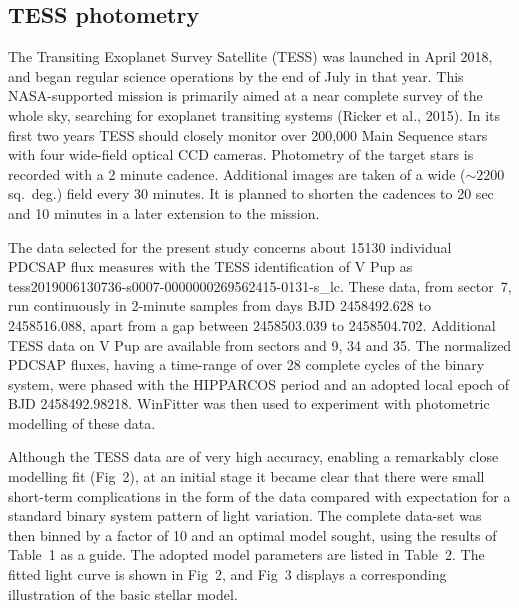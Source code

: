 \documentclass[useAMS,usenatbib]{mnras}                                                                           \usepackage[pdftex]{graphicx}
\begin{document}
 \subsection{TESS photometry}
The Transiting Exoplanet Survey Satellite (TESS) was launched in April 2018, and began regular science
operations by the end of July in that year.  This NASA-supported mission is primarily aimed at
a near complete survey of the whole sky, searching for exoplanet transiting systems
(Ricker et al., 2015).
In its first two years  TESS should closely monitor over
   200,000 Main Sequence stars with four wide-field optical CCD cameras.
    Photometry of the target stars is recorded with a 2 minute cadence. 
Additional images are taken of a wide ($\sim 2200$ sq.\ deg.) field every 30 minutes.  
    It is planned to shorten the cadences to 20 sec and 10 minutes in a later extension
    to the mission.

 The data selected for the present study concerns about 15130 individual PDCSAP flux
 measures with the TESS identification of V Pup as 
 tess2019006130736-s0007-0000000269562415-0131-s{\_}lc.  These data, from sector~7, run 
 continuously in 2-minute samples from days BJD
 2458492.628 to 2458516.088, apart from a gap between 2458503.039 to 2458504.702. 
Additional  TESS data on V Pup are available from sectors  and 9, 34 and 35.
The normalized PDCSAP fluxes, having a time-range of over 28 complete cycles of the binary
system, were phased with the HIPPARCOS period and an adopted local epoch of BJD 2458492.98218.
 {\sc WinFitter} was then used to experiment with photometric modelling of these data.
 
 Although the TESS data are of very high accuracy, enabling a remarkably close 
 modelling fit (Fig~2), 
 at an initial stage it became clear that there were small short-term complications in the 
 form of the data compared with expectation for a standard binary system pattern of light variation. 
The complete data-set was then binned by a factor of 10 and an optimal model sought, using the
results of Table~1 as a guide.  The adopted model parameters are listed in Table~2.
The fitted light curve is shown in Fig~2, and
Fig~3 displays a corresponding illustration of the basic stellar model.
\end{document}

